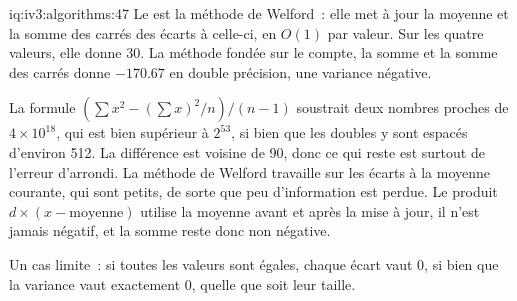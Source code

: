 \begin{solution}{iq:iv3:algorithms:47}
Le  est la méthode de Welford~: elle met à jour la moyenne et la somme des carrés des écarts à celle-ci, en $O(1)$ par valeur. Sur les quatre valeurs, elle donne 30. La méthode fondée sur le compte, la somme et la somme des carrés donne $-170.67$ en double précision, une variance négative.
\label{lst:iv3:al:welford}

La formule $(\sum x^2 - (\sum x)^2/n) / (n - 1)$ soustrait deux nombres proches de $4 \times 10^{18}$, qui est bien supérieur à $2^{53}$, si bien que les doubles y sont espacés d'environ 512. La différence est voisine de 90, donc ce qui reste est surtout de l'erreur d'arrondi. La méthode de Welford travaille sur les écarts à la moyenne courante, qui sont petits, de sorte que peu d'information est perdue. Le produit $d \times (x - \text{moyenne})$ utilise la moyenne avant et après la mise à jour, il n'est jamais négatif, et la somme reste donc non négative.

Un cas limite~: si toutes les valeurs sont égales, chaque écart vaut 0, si bien que la variance vaut exactement 0, quelle que soit leur taille.

\end{solution}


